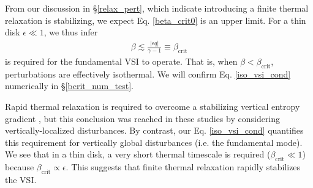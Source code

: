 From our discussion in \S\ref{relax_pert}, which indicate introducing
a finite thermal relaxation is stabilizing, we expect
Eq. \ref{beta_crit0} is an upper limit. For a thin  
disk $\epsilon\ll 1$, we thus infer 
\begin{align}\label{iso_vsi_cond}
  \beta \lesssim \frac{|\epsilon q|}{\gamma-1} \equiv
  \beta_\mathrm{crit} 
\end{align}
is required for the fundamental VSI to operate. That is, when
$\beta<\beta_\mathrm{crit}$, perturbations are  effectively isothermal. 
We will confirm Eq. \ref{iso_vsi_cond} numerically in
\S\ref{bcrit_num_test}. 

Rapid thermal relaxation is required to overcome a stabilizing
vertical entropy gradient \citep{goldreich67,urpin98,urpin03}, but
this conclusion was reached in these studies by considering
vertically-localized disturbances. %
By contrast, our Eq. \ref{iso_vsi_cond} quantifies this requirement
for vertically global disturbances (i.e. the fundamental mode). We see
that in a thin disk, a very short thermal timescale
 is required ($\beta_\mathrm{crit}\ll 1$) because
$\beta_\mathrm{crit}\propto \epsilon$. 
This suggests that
finite thermal relaxation rapidly stabilizes the VSI.  








